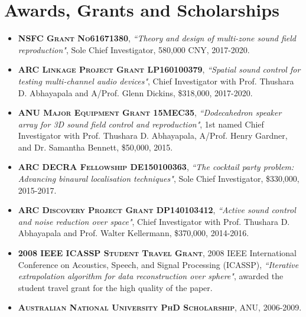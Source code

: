\documentclass[10pt]{article}
\begin{document}
\section*{Awards, Grants and Scholarships}
%
\begin{itemize}
%
\item \textsc{\textbf{NSFC Grant No61671380}}, \emph{``Theory and design of multi-zone sound field reproduction"}, Sole Chief Investigator, 580,000 CNY, 2017-2020.

\item \textsc{\textbf{ARC Linkage Project Grant LP160100379}}, \emph{``Spatial sound control for testing multi-channel audio devices"}, Chief Investigator with Prof. Thushara D. Abhayapala and A/Prof. Glenn Dickins, \$318,000, 2017-2020. 

\item \textsc{\textbf{ANU Major Equipment Grant 15MEC35}}, \emph{``Dodecahedron speaker array for 3D sound field control and reproduction"}, 1st named Chief Investigator with Prof. Thushara D. Abhayapala, A/Prof. Henry Gardner, and Dr. Samantha Bennett, \$50,000, 2015.

\item \textsc{\textbf{ARC DECRA Fellowship DE150100363}}, \emph{``The cocktail party problem: Advancing binaural localisation techniques"}, Sole Chief Investigator, \$330,000, 2015-2017. 

\item \textsc{\textbf{ARC Discovery Project Grant DP140103412}},  \emph{``Active sound control and noise reduction over space"}, Chief Investigator with Prof. Thushara D. Abhayapala and Prof. Walter Kellermann, \$370,000, 2014-2016. 


\item \textsc{\textbf{2008 IEEE ICASSP Student Travel Grant}}, 2008 IEEE International Conference on Acoustics,
Speech, and Signal Processing (ICASSP), \emph{``Iterative extrapolation algorithm for data reconstruction over sphere"}, awarded the student travel grant for the high quality of the paper.

\item \textsc{\textbf{Australian National University PhD Scholarship}}, ANU, 2006-2009.


\end{itemize}
\end{document}
